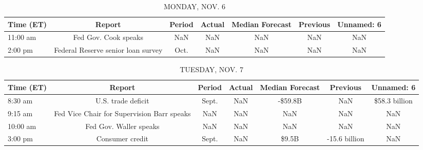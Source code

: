 \documentclass{article}%
\begin{document}
%
\normalsize%


\begin{table}[htbp]%
\caption{MONDAY, NOV. 6}%
\centering%
\begin{adjustbox}{width=1\textwidth}%
\begin{tabular}{lcccccc}
\toprule
Time (ET) &                             Report & Period & Actual & Median Forecast & Previous & Unnamed: 6 \\
\midrule
 11:00 am &               Fed Gov. Cook speaks &    NaN &    NaN &             NaN &      NaN &        NaN \\
  2:00 pm & Federal Reserve senior loan survey &   Oct. &    NaN &             NaN &      NaN &        NaN \\
\bottomrule
\end{tabular}
%
\end{adjustbox}%
\end{table}

%


\begin{table}[htbp]%
\caption{TUESDAY, NOV. 7}%
\centering%
\begin{adjustbox}{width=1\textwidth}%
\begin{tabular}{lcccccc}
\toprule
Time (ET) &                                     Report & Period & Actual & Median Forecast &      Previous &    Unnamed: 6 \\
\midrule
  8:30 am &                         U.S. trade deficit &  Sept. &    NaN &         -\$59.8B &           NaN & \$58.3 billion \\
  9:15 am & Fed Vice Chair for Supervision Barr speaks &    NaN &    NaN &             NaN &           NaN &           NaN \\
 10:00 am &                     Fed Gov. Waller speaks &    NaN &    NaN &             NaN &           NaN &           NaN \\
  3:00 pm &                            Consumer credit &  Sept. &    NaN &           \$9.5B & -15.6 billion &           NaN \\
\bottomrule
\end{tabular}
%
\end{adjustbox}%
\end{table}

%
\end{document}
